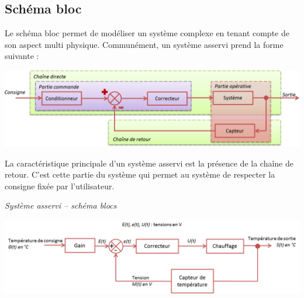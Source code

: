 \documentclass[11pt,oneside]{article}
\begin{document}
\subsection{Schéma bloc}
Le schéma bloc permet de modéliser un système complexe en tenant compte de son aspect multi physique. Communément, un système asservi prend la forme suivante : 

\begin{center}
    \includegraphics[width=\textwidth]{png/schbloc}
\end{center}


La caractéristique principale d'un système asservi est la présence de la chaîne de retour. C'est cette partie du système qui permet au système de respecter la consigne fixée par l'utilisateur.

\begin{exemple}
\textit{Système asservi -- schéma blocs}
\begin{center}
    \includegraphics[width=\textwidth]{png/chauffage}
\end{center}
\end{exemple}
\end{document}
